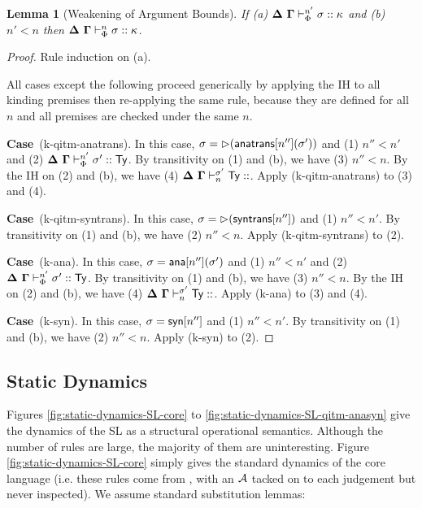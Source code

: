 \documentclass[12pt]{article}
\newtheorem{lemma}{Lemma}
\newcommand{\pfcase}[1]{\textbf{Case}~#1. }
\begin{document}
\begin{lemma}[Weakening of Argument Bounds]
\label{lemma:weakening-of-argument-bounds}
\small If (a) $\boldsymbol\Delta~\boldsymbol\Gamma \vdash_{\Phi}^{n'} \sigma :: \kappa$ and (b) $n' < n$ then $\boldsymbol\Delta~\boldsymbol\Gamma \vdash_{\Phi}^{n} \sigma :: \kappa$.
\end{lemma}
\begin{proof}Rule induction on (a).

All cases except the following proceed generically by applying the IH to all kinding premises then re-applying the same rule, because they are defined for all $n$ and all premises are checked under the same $n$.

\pfcase{(k-qitm-anatrans)} In this case, $\sigma={\rhd}({\sf anatrans}[n''](\sigma'))$ and (1) $n'' < n'$ and (2) $\boldsymbol\Delta~\boldsymbol\Gamma \vdash_{\Phi}^{n'} \sigma' :: {\sf Ty}$. By transitivity on (1) and (b), we have (3) $n'' < n$. By the IH on (2) and (b), we have (4) $\sofkn{\kDelta}{\kGamma}{n}{\st'}{\kty}$. Apply (k-qitm-anatrans) to (3) and (4).

\pfcase{(k-qitm-syntrans)} In this case, $\sigma={\rhd}({\sf syntrans}[n''])$ and (1) $n'' < n'$. By transitivity on (1) and (b), we have (2) $n'' < n$. Apply (k-qitm-syntrans) to (2).

\pfcase{(k-ana)} In this case, $\sigma={\sf ana}[n''](\sigma')$ and (1) $n'' < n'$ and (2) $\boldsymbol\Delta~\boldsymbol\Gamma \vdash_{\Phi}^{n'} \sigma' :: {\sf Ty}$. By transitivity on (1) and (b), we have (3) $n'' < n$. By the IH on (2) and (b), we have (4) $\sofkn{\kDelta}{\kGamma}{n}{\st'}{\kty}$. Apply (k-ana) to (3) and (4).

\pfcase{(k-syn)} In this case, $\sigma={\sf syn}[n'']$ and (1) $n'' < n'$. By transitivity on (1) and (b), we have (2) $n'' < n$. Apply (k-syn) to (2).
\end{proof}




\subsection{Static Dynamics}



Figures \ref{fig:static-dynamics-SL-core} to \ref{fig:static-dynamics-SL-qitm-anasyn} give the dynamics of the SL as a structural operational semantics. Although the number of rules are large, the majority of them are uninteresting. Figure \ref{fig:static-dynamics-SL-core} simply gives the standard dynamics of the core language (i.e. these rules come from \cite{pfpl}, with an $\mathcal{A}$ tacked on to each judgement but never inspected). We assume standard substitution lemmas:
\end{document}
